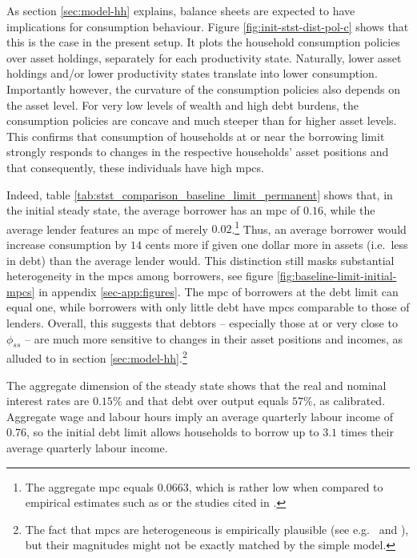 \documentclass[a4paper,12pt]{article} %
\numberwithin{equation}{section} %
\numberwithin{figure}{section}
\numberwithin{table}{section}
\begin{document}
As section \ref{sec:model-hh} explains, balance sheets are expected to have implications for consumption behaviour. Figure \ref{fig:init-stst-dist-pol-c} shows that this is the case in the present setup. It plots the household consumption policies over asset holdings, separately for each productivity state. Naturally, lower asset holdings and/or lower productivity states translate into lower consumption. Importantly however, the curvature of the consumption policies also depends on the asset level. For very low levels of wealth and high debt burdens, the consumption policies are concave and much steeper than for higher asset levels. This confirms that consumption of households at or near the borrowing limit strongly responds to changes in the respective households' asset positions and that consequently, these individuals have high \Gls{mpc}s.

Indeed, table \ref{tab:stst_comparison_baseline_limit_permanent} shows that, in the initial steady state, the average borrower has an \Gls{mpc} of $0.16$, while the average lender features an \Gls{mpc} of merely $0.02$.\footnote{The aggregate \Gls{mpc} equals $0.0663$, which is rather low when compared to empirical estimates such as \textcite{fagereng2021mpc} or the studies cited in \textcite{kaplan2018}.} Thus, an average borrower would increase consumption by $14$ cents more if given one dollar more in assets (i.e.~less in debt) than the average lender would. This distinction still masks substantial heterogeneity in the \Gls{mpc}s among borrowers, see figure \ref{fig:baseline-limit-initial-mpcs} in appendix \ref{sec-app:figures}. The \Gls{mpc} of borrowers at the debt limit can equal one, while borrowers with only little debt have \Gls{mpc}s comparable to those of lenders. Overall, this suggests that debtors -- especially those at or very close to $\phi_{ss}$ -- are much more sensitive to changes in their asset positions and incomes, as alluded to in section \ref{sec:model-hh}.\footnote{The fact that \Gls{mpc}s are heterogeneous is empirically plausible (see e.g.~\cite{gross2002} and \cite{fagereng2021mpc}), but their magnitudes might not be exactly matched by the simple model.}

The aggregate dimension of the steady state shows that the real and nominal interest rates are $0.15\%$ and that debt over output equals $57\%$, as calibrated. Aggregate wage and labour hours imply an average quarterly labour income of $0.76$, so the initial debt limit allows households to borrow up to $3.1$ times their average quarterly labour income. 
\end{document}

